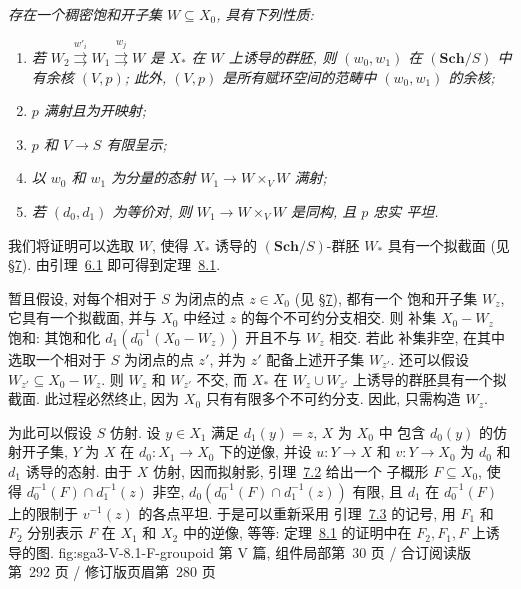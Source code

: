 \textit{存在一个稠密饱和开子集 \(W\subseteq X_0\),
具有下列性质:}
\begin{enumerate}
\item[(i)]\label{thm:sga3-V-8.1-i}%
  \textit{若
  \(W_2\overset{w'_i}{\rightrightarrows}
    W_1\overset{w_j}{\rightrightarrows}W\)
  是 \(X_\ast\) 在 \(W\) 上诱导的群胚, 则
  \((w_0,w_1)\) 在
  \((\mathbf{Sch}/S)\) 中有余核 \((V,p)\); 此外,
  \((V,p)\) 是所有赋环空间的范畴中
  \((w_0,w_1)\) 的余核;}
\item[(ii)]\label{thm:sga3-V-8.1-ii}%
  \textit{\(p\) 满射且为开映射;}
\item[(ii')]\label{thm:sga3-V-8.1-iip}%
  \textit{\(p\) 和 \(V\to S\) 有限呈示;}
\item[(iii)]\label{thm:sga3-V-8.1-iii}%
  \textit{以 \(w_0\) 和 \(w_1\) 为分量的态射 \(W_1\to W\times_VW\)
  满射;}
\item[(iv)]\label{thm:sga3-V-8.1-iv}%
  \textit{若 \((d_0,d_1)\) 为等价对, 则
  \(W_1\to W\times_VW\) 是同构, 且 \(p\) 忠实
  平坦.}
\end{enumerate}

我们将证明可以选取 \(W\), 使得
\(X_\ast\) 诱导的 \((\mathbf{Sch}/S)\)-群胚 \(W_\ast\)
具有一个拟截面 (见 \hyperref[sec:sga3-V-7]{\S7}).
由引理~\hyperref[lem:sga3-V-6.1]{6.1}
即可得到定理~\hyperref[thm:sga3-V-8.1]{8.1}.

暂且假设, 对每个相对于 \(S\) 为闭点的点 \(z\in X_0\)
(见 \hyperref[sec:sga3-V-7]{\S7}), 都有一个
饱和开子集 \(W_z\), 它具有一个拟截面, 并与
\(X_0\) 中经过 \(z\) 的每个不可约分支相交. 则
补集 \(X_0-W_z\) 饱和: 其饱和化
\(d_1(d_0^{-1}(X_0-W_z))\) 开且不与 \(W_z\) 相交. 若此
补集非空, 在其中选取一个相对于 \(S\) 为闭点的点 \(z'\),
并为 \(z'\) 配备上述开子集 \(W_{z'}\).
还可以假设 \(W_{z'}\subseteq X_0-W_z\). 则 \(W_z\) 和
\(W_{z'}\) 不交, 而 \(X_\ast\) 在
\(W_z\cup W_{z'}\) 上诱导的群胚具有一个拟截面. 此过程必然终止,
因为 \(X_0\) 只有有限多个不可约分支.
因此, 只需构造 \(W_z\).

为此可以假设 \(S\) 仿射. 设 \(y\in X_1\)
满足 \(d_1(y)=z\), \(X\) 为 \(X_0\) 中
包含 \(d_0(y)\) 的仿射开子集, \(Y\) 为 \(X\) 在
\(d_0:X_1\to X_0\) 下的逆像, 并设 \(u:Y\to X\) 和 \(v:Y\to X_0\)
为 \(d_0\) 和 \(d_1\) 诱导的态射. 由于 \(X\) 仿射,
因而拟射影, 引理~\hyperref[lem:sga3-V-7.2]{7.2} 给出一个
子概形 \(F\subseteq X_0\), 使得
\(d_0^{-1}(F)\cap d_1^{-1}(z)\) 非空,
\(d_0(d_0^{-1}(F)\cap d_1^{-1}(z))\) 有限, 且
\(d_1\) 在 \(d_0^{-1}(F)\) 上的限制于 \(v^{-1}(z)\) 的各点平坦.
于是可以重新采用
引理~\hyperref[lem:sga3-V-7.3]{7.3} 的记号, 用 \(F_1\) 和 \(F_2\)
分别表示 \(F\) 在 \(X_1\) 和 \(X_2\) 中的逆像, 等等:
  {定理~\hyperref[thm:sga3-V-8.1]{8.1} 的证明中在 \(F_2,F_1,F\) 上诱导的图.}
  {fig:sga3-V-8.1-F-groupoid}
  {第 V 篇, 组件局部第~30 页 / 合订阅读版第~292 页 / 修订版页眉第~280 页}

